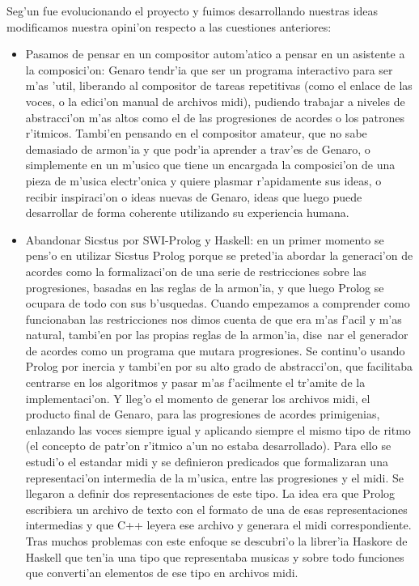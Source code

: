 Seg'un fue evolucionando el proyecto y fuimos desarrollando nuestras ideas modificamos nuestra opini'on respecto a las cuestiones anteriores:
        \begin{itemize}
        \item Pasamos de pensar en un compositor autom'atico a pensar en un asistente a la composici'on: Genaro tendr'ia que ser un programa interactivo para ser m'as 'util, liberando al compositor de tareas repetitivas (como el enlace de las voces, o la edici'on manual de archivos midi), pudiendo trabajar a niveles de abstracci'on m'as altos como el de las progresiones de acordes o los patrones r'itmicos. Tambi'en pensando en el compositor amateur, que no sabe demasiado de armon'ia y que podr'ia aprender a trav'es de Genaro, o simplemente en un m'usico que tiene un encargada la composici'on de una pieza de m'usica electr'onica y quiere plasmar r'apidamente sus ideas, o recibir inspiraci'on o ideas nuevas de Genaro, ideas que luego puede desarrollar de forma coherente utilizando su experiencia humana.
        \item Abandonar Sicstus por SWI-Prolog y Haskell: en un primer momento se pens'o en utilizar Sicstus Prolog porque se preted'ia abordar la generaci'on de acordes como la formalizaci'on de una serie de restricciones sobre las progresiones, basadas en las reglas de la armon'ia, y que luego Prolog se ocupara de todo con sus b'usquedas. Cuando empezamos a comprender como funcionaban las restricciones nos dimos cuenta de que era m'as f'acil y m'as natural, tambi'en por las propias reglas de la armon'ia, dise~nar el generador de acordes como un programa que mutara progresiones.
\newline
Se continu'o usando Prolog por inercia y tambi'en por su alto grado de abstracci'on, que facilitaba centrarse en los algoritmos y pasar m'as f'acilmente el tr'amite de la implementaci'on. Y lleg'o el momento de generar los archivos midi, el producto final de Genaro, para las progresiones de acordes primigenias, enlazando las voces siempre igual y aplicando siempre el mismo tipo de ritmo (el concepto de patr'on r'itmico a'un no estaba desarrollado). Para ello se estudi'o el estandar midi y se definieron predicados que formalizaran una representaci'on intermedia de la m'usica, entre las progresiones y el midi. Se llegaron a definir dos representaciones de este tipo. La idea era que Prolog escribiera un archivo de texto con el formato de una de esas representaciones intermedias y que C++ leyera ese archivo y generara el midi correspondiente. Tras muchos problemas con este enfoque se descubri'o la librer'ia Haskore de Haskell que ten'ia una tipo que representaba musicas y sobre todo funciones que converti'an elementos de ese tipo en archivos midi.

\end{itemize}
